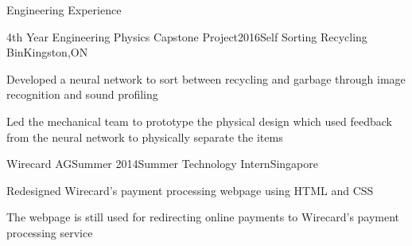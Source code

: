 \documentclass{resume2} %
\begin{document}

\begin{rSection}{Engineering Experience}
	
	\begin{rSubsection}{4th Year Engineering Physics Capstone Project}{2016}{Self Sorting Recycling Bin}{Kingston,ON}
		\item Developed a neural network to sort between recycling and garbage through image recognition and sound profiling
		\item Led the mechanical team to prototype the physical design which used feedback from the neural network to physically separate the items 
	\end{rSubsection}
\iffalse
	\begin{rSubsection}{Engineering Physics Design Project}{2015}{Photodiode Research Sensor}{}
		\item Designed and fabricated a research sensor used to assess the properties of photodiodes. Information gathered included efficiency, current and voltage under illuminated and darkened conditions using an Arduino, Matlab and LabVIEW
	\end{rSubsection}

	\begin{rSubsection}{Engineering Design and Practice II}{2014}{Nuclear Waste Gamma Radiation Detector}{Kingston,ON}
		\item Prototyped a Nuclear Waste Gamma Radiation Detector. Through the process of material selection and decision making, the final product was designed for use in areas surrounding the Deep Geologic Repository in Ontario
	\end{rSubsection}
\fi
	\begin{rSubsection}{Wirecard AG}{Summer 2014}{Summer Technology Intern}{Singapore}
	\item Redesigned Wirecard's payment processing webpage using HTML and CSS
	\item The webpage is still used for redirecting online payments to Wirecard's payment processing service	
	\end{rSubsection}

	\begin{rSubsection}{}{}{}{}
     
	\end{rSubsection}

\end{rSection}
\end{document}
